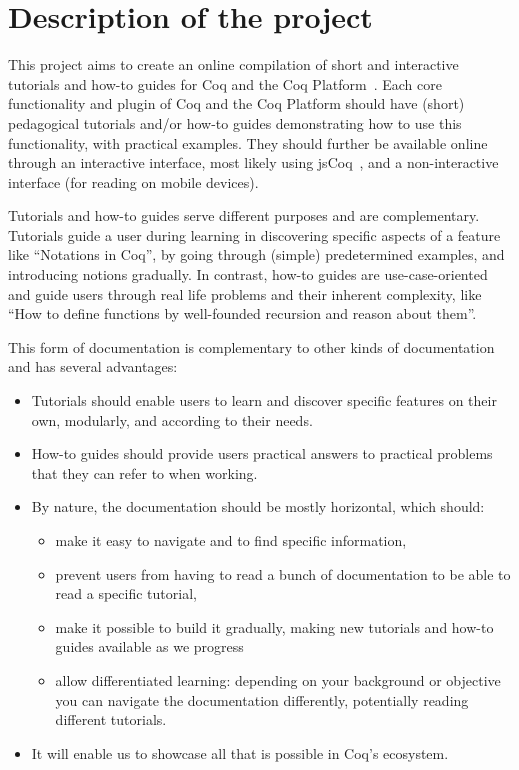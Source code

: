 \documentclass{easychair}
\begin{document}
\section{Description of the project}

This project aims to create an online compilation of short and interactive
tutorials and how-to guides for Coq and the Coq Platform~\cite{Link_Coq_Platform,palmskog2022reliably}.
Each core functionality and plugin of Coq and the Coq Platform should have
(short) pedagogical tutorials and/or how-to guides demonstrating how to use this
functionality, with practical examples. They should further be available online
through an interactive interface, most likely using jsCoq~\cite{jscoq},
and a non-interactive interface (for reading on mobile devices).

Tutorials and how-to guides serve different purposes and are complementary.
Tutorials guide a user during learning in discovering specific aspects of a
feature like ``Notations in Coq'', by going through (simple) predetermined
examples, and introducing notions gradually. In contrast, how-to guides are
use-case-oriented and guide users through real life problems and their inherent
complexity, like ``How to define functions by well-founded recursion and reason
about them''.

This form of documentation is complementary to other kinds of documentation and
has several advantages:

\begin{itemize}[itemsep=0pt]
  \item Tutorials should enable users to learn and discover specific features on
        their own, modularly, and according to their needs.
  \item How-to guides should provide users practical answers to practical problems
        that they can refer to when working.
  \item By nature, the documentation should be mostly horizontal, which should:
    \begin{itemize}[itemsep=0pt]
      \item make it easy to navigate and to find specific information,
      \item prevent users from having to read a bunch of documentation to be
	    able to read a specific tutorial,
      \item make it possible to build it gradually, making new tutorials and
	    how-to guides available as we progress
      \item allow differentiated learning: depending on your background or
            objective you can navigate the documentation differently,
            potentially reading different tutorials.
    \end{itemize}
  \item It will enable us to showcase all that is possible in Coq's ecosystem.
\end{itemize}
\end{document}
